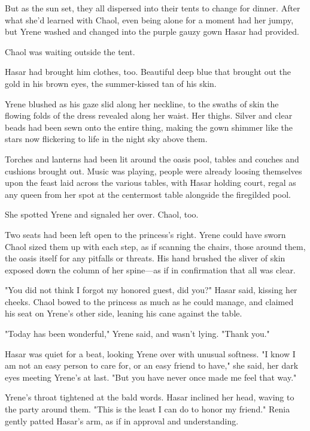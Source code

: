 But as the sun set, they all dispersed into their tents to change for dinner. After what she'd learned with Chaol, even being alone for a moment had her jumpy, but Yrene washed and changed into the purple gauzy gown Hasar had provided.

Chaol was waiting outside the tent.

Hasar had brought him clothes, too. Beautiful deep blue that brought out the gold in his brown eyes, the summer-kissed tan of his skin.

Yrene blushed as his gaze slid along her neckline, to the swaths of skin the flowing folds of the dress revealed along her waist. Her thighs. Silver and clear beads had been sewn onto the entire thing, making the gown shimmer like the stars now flickering to life in the night sky above them.

Torches and lanterns had been lit around the oasis pool, tables and couches and cushions brought out. Music was playing, people were already loosing themselves upon the feast laid across the various tables, with Hasar holding court, regal as any queen from her spot at the centermost table alongside the firegilded pool.

She spotted Yrene and signaled her over. Chaol, too.

Two seats had been left open to the princess's right. Yrene could have sworn Chaol sized them up with each step, as if scanning the chairs, those around them, the oasis itself for any pitfalls or threats. His hand brushed the sliver of skin exposed down the column of her spine---as if in confirmation that all was clear.

"You did not think I forgot my honored guest, did you?" Hasar said, kissing her cheeks. Chaol bowed to the princess as much as he could manage, and claimed his seat on Yrene's other side, leaning his cane against the table.

"Today has been wonderful," Yrene said, and wasn't lying. "Thank you."

Hasar was quiet for a beat, looking Yrene over with unusual softness. "I know I am not an easy person to care for, or an easy friend to have," she said, her dark eyes meeting Yrene's at last. "But you have never once made me feel that way."

Yrene's throat tightened at the bald words. Hasar inclined her head, waving to the party around them. "This is the least I can do to honor my friend." Renia gently patted Hasar's arm, as if in approval and understanding.

